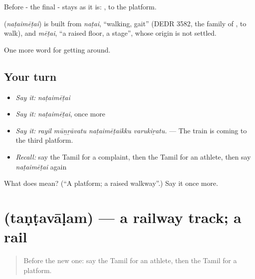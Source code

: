 Before - the final - stays as it is: , to the platform.

\begin{cousinweb}
\textbf{} (\emph{naṭaimēṭai}) is built from \emph{naṭai}, \textquotedblleft{}walking, gait\textquotedblright{} (DEDR 3582, the family of , to walk), and \emph{mēṭai}, \textquotedblleft{}a raised floor, a stage\textquotedblright{}, whose origin is not settled.
\end{cousinweb}

\begin{grammarlens}[title={What you've built}]
One more word for getting around.
\end{grammarlens}

\subsection*{Your turn}
\begin{itemize}
\raggedright
  \item \emph{Say it:} \emph{naṭaimēṭai}
  \item \emph{Say it:} \emph{naṭaimēṭai}, once more
  \item \emph{Say it:} \emph{rayil mūṉṟāvatu naṭaimēṭaikku varukiṟatu.} — The train is coming to the third platform.
  \item \emph{Recall:} say the Tamil for a complaint, then the Tamil for an athlete, then say \emph{naṭaimēṭai} again
\end{itemize}

\begin{tcolorbox}[breakable,colback=teal!4,colframe=teal!35!black,title={Before you move on}]
What does  mean? (\textquotedblleft{}A platform; a raised walkway\textquotedblright{}.) Say it once more.
\end{tcolorbox}
\section[\texorpdfstring{\ta{தண்டவாளம்} (taṇṭavāḷam)}{தண்டவாளம் (taṇṭavāḷam)}]{ (taṇṭavāḷam) — a railway track; a rail}

\label{lesson:TA-C400-tantavalam}



\begin{quote}
Before the new one: say the Tamil for an athlete, then the Tamil for a platform.
\end{quote}

